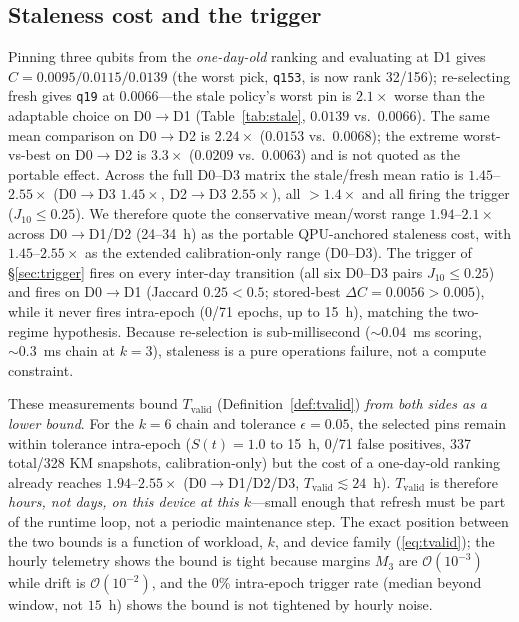 \documentclass[journal,10pt,twocolumn]{IEEEtran}
\newcommand{\q}[1]{\texttt{q#1}}
\begin{document}
\subsection{Staleness cost and the trigger}
Pinning three qubits from the \emph{one-day-old} ranking and evaluating at D1 gives $C{=}0.0095/0.0115/0.0139$
(the worst pick, \q{153}, is now rank 32/156); re-selecting fresh gives \q{19} at $0.0066$---the stale policy's
worst pin is $2.1\times$ worse than the adaptable choice on D0$\to$D1 (Table~\ref{tab:stale}, $0.0139$ vs.\
$0.0066$). The same mean comparison on D0$\to$D2 is $2.24\times$ ($0.0153$ vs.\ $0.0068$); the extreme
worst-vs-best on D0$\to$D2 is $3.3\times$ ($0.0209$ vs.\ $0.0063$) and is not quoted as the portable effect.
Across the full D0--D3 matrix the stale/fresh mean ratio is $1.45$--$2.55\times$ (D0$\to$D3 $1.45\times$, D2$\to$D3 $2.55\times$),
all $>1.4\times$ and all firing the trigger ($J_{10}\le0.25$). We therefore quote the conservative mean/worst range $1.94$--$2.1\times$ across D0$\to$D1/D2 (24--34~h) as the
portable QPU-anchored staleness cost, with $1.45$--$2.55\times$ as the extended calibration-only range (D0--D3).
The trigger of \S\ref{sec:trigger} fires on every inter-day transition (all six D0--D3 pairs $J_{10}\le0.25$) and fires on D0$\to$D1 (Jaccard $0.25<0.5$; stored-best $\Delta C{=}0.0056>0.005$), while it never fires intra-epoch (0/71 epochs, up to 15~h), matching the two-regime hypothesis. Because re-selection is
sub-millisecond ($\sim0.04$~ms scoring, $\sim0.3$~ms chain at $k{=}3$), staleness is a pure operations failure,
not a compute constraint.

These measurements bound $T_{\mathrm{valid}}$ (Definition~\ref{def:tvalid}) \emph{from both sides as a lower bound}.
For the $k{=}6$ chain and tolerance $\epsilon{=}0.05$, the selected pins remain within tolerance intra-epoch
($S(t){=}1.0$ to 15~h, 0/71 false positives, 337 total/328 KM snapshots, calibration-only) but the cost of a one-day-old ranking already reaches $1.94$--$2.55\times$ (D0$\to$D1/D2/D3, $T_{\mathrm{valid}}\lesssim24$~h).
$T_{\mathrm{valid}}$ is therefore \emph{hours, not days, on this device at this $k$}---small enough that
refresh must be part of the runtime loop, not a periodic maintenance step. The exact position between the two bounds
is a function of workload, $k$, and device family (\ref{eq:tvalid}); the hourly telemetry shows the bound is
tight because margins $M_3$ are $\mathcal{O}(10^{-3})$ while drift is $\mathcal{O}(10^{-2})$, and the 0\% intra-epoch trigger rate (median beyond window, not $15$~h) shows the bound is not tightened by hourly noise.
\end{document}
